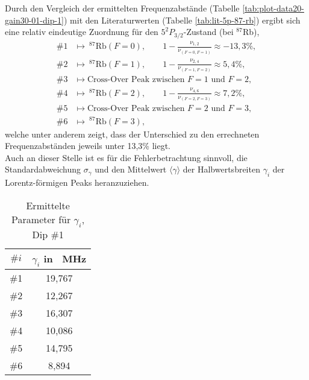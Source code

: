 \noindent Durch den Vergleich der ermittelten Frequenzabstände (Tabelle \ref{tab:plot-data20-gain30-01-dip-1}) mit den Literaturwerten (Tabelle \ref{tab:lit-5p-87-rb}) ergibt sich eine relativ eindeutige Zuordnung für den $5^{2}P_{3/2}$-Zustand (bei $^{87}$Rb), 
\begin{align*}
    \#1 &\mapsto \ ^{87}\text{Rb}(F = 0), \qquad 1 - \frac{\nu_{1,2}}{\nu_{(F = 0, F = 1)}} \approx -13,3\%, \\
    \#2 &\mapsto \ ^{87}\text{Rb}(F = 1), \qquad 1 - \frac{\nu_{2,4}}{\nu_{(F = 1, F = 2)}} \approx 5,4 \%, \\
    \#3 &\mapsto \text{Cross-Over Peak zwischen $F = 1$ und $F = 2$}, \\
    \#4 &\mapsto \ ^{87}\text{Rb}(F = 2), \qquad 1 - \frac{\nu_{4,6}}{\nu_{(F = 2, F = 3)}} \approx 7,2 \%, \\
    \#5 &\mapsto \text{Cross-Over Peak zwischen $F = 2$ und $F = 3$}, \\
    \#6 &\mapsto \ ^{87}\text{Rb}(F = 3),
\end{align*}
welche unter anderem zeigt, dass der Unterschied zu den errechneten Frequenzabständen jeweils unter 13,3\% liegt. \\

\noindent Auch an dieser Stelle ist es für die Fehlerbetrachtung sinnvoll, die Standardabweichung $\sigma_{\gamma}$ und den Mittelwert $\langle \gamma \rangle$ der Halbwertsbreiten $\gamma_{i}$ der Lorentz-förmigen Peaks heranzuziehen.

\begin{table}[H]
    \centering
    \begin{tabular}{|c|c|}
        \hline
         $\#i$      &       $\gamma_{i}$ in \SI{}{\mega \hertz}  \\
        \hline
        \hline
         \#1        &        19,767         \\
        \hline
         \#2        &        12,267         \\
        \hline
         \#3        &        16,307         \\
        \hline
         \#4        &        10,086         \\
        \hline
         \#5        &        14,795         \\
        \hline
         \#6        &         8,894         \\
        \hline
    \end{tabular}
    \caption{Ermittelte Parameter für $\gamma_{i}$, Dip \textcolor{red!80!black}{\#1}}
    \label{tab:gamma-parameter-dip-1}
\end{table}

